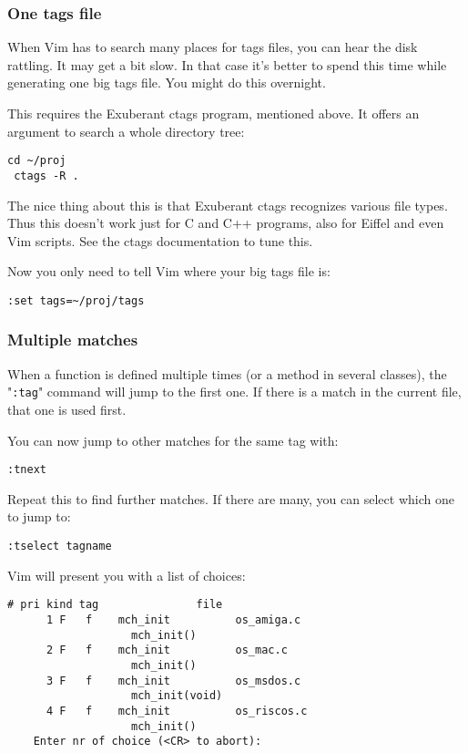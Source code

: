 \subsubsection{One tags file}
When Vim has to search many places for tags files, you can hear the disk rattling.
It may get a bit slow.
In that case it's better to spend this time while generating one big tags file.
You might do this overnight.

This requires the Exuberant ctags program, mentioned above.
It offers an argument to search a whole directory tree:

\begin{Verbatim}[samepage=true]
 cd ~/proj
 ctags -R .
\end{Verbatim}

The nice thing about this is that Exuberant ctags recognizes various file types.
Thus this doesn't work just for C and C++ programs, also for Eiffel and even Vim scripts.
See the ctags documentation to tune this.

Now you only need to tell Vim where your big tags file is:

\begin{Verbatim}[samepage=true]
 :set tags=~/proj/tags
\end{Verbatim}
\subsubsection{Multiple matches}
When a function is defined multiple times (or a method in several classes), the "\verb!:tag!" command will jump to the first one.
If there is a match in the current file, that one is used first.

You can now jump to other matches for the same tag with:

\begin{Verbatim}[samepage=true]
 :tnext
\end{Verbatim}

Repeat this to find further matches.
If there are many, you can select which one to jump to:

\begin{Verbatim}[samepage=true]
 :tselect tagname
\end{Verbatim}

Vim will present you with a list of choices:

\begin{Verbatim}[samepage=true]
      # pri kind tag               file 
      1 F   f    mch_init          os_amiga.c 
                   mch_init() 
      2 F   f    mch_init          os_mac.c 
                   mch_init() 
      3 F   f    mch_init          os_msdos.c 
                   mch_init(void) 
      4 F   f    mch_init          os_riscos.c 
                   mch_init() 
    Enter nr of choice (<CR> to abort):  
\end{Verbatim}

